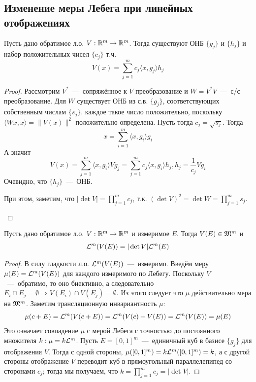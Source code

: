 \subsection{Изменение меры Лебега при линейных отображениях}
\begin{fact}[Из линала, б/д]
    Пусть дано обратимое л.о. $V: \mathbb{R}^m \rightarrow \mathbb{R}^m$. Тогда существуют ОНБ $\{g_j\}$ и $\{h_j\}$ и набор положительных чисел $\{c_j\}$ т.ч. \[V(x) = \sum\limits_{j = 1}^m c_j\langle x, g_j \rangle h_j\]
\end{fact}
\begin{proof}
    Рассмотрим $V^*$~---~сопряжённое к $V$ преобразование и $W = V^*V$~---~с/с преобразование. Для $W$  существует ОНБ из с.в. $\{g_j\}$, соответствующих собственным числам $\{s_j\}$. каждое такое число положительно, поскольку $\langle Wx, x \rangle = \|V(x)\|^2$ положительно определена. Пусть тогда $c_j = \sqrt{s_j}$. Тогда \[x = \sum\limits_{i = 1}^m \langle x, g_i \rangle g_i\]
    А значит \[V(x) = \sum\limits_{j = 1}^m \langle x, g_i \rangle Vg_j = \sum\limits_{j = 1}^m c_j \langle x, g_i \rangle h_j, h_j = \dfrac{1}{c_j}Vg_i\]
    Очевидно, что $\{h_j\}$~---~ОНБ.
\begin{note}
    При этом, заметим, что $|\det V| = \prod\limits_{j = 1}^m c_j$, т.к. $(\det V)^2 = \det W = \prod\limits_{j = 1}^m s_j$.
\end{note}
\end{proof}

\begin{theorem}
    Пусть дано обратимое л.о. $V: \mathbb{R}^m \rightarrow \mathbb{R}^m$ и измеримое $E$. Тогда $V(E) \in \mathfrak{M}^m$ и \[\mathcal{L}^m(V(E)) = |\det V| \mathcal{L}^m(E)\]
\end{theorem}
\begin{proof}
    В силу гладкости л.о. $\mathcal{L}^m(V(E))$~---~измеримо.
    Введём меру $\mu(E) = \mathcal{L}^m(V(E))$ для каждого измеримого по Лебегу. Поскольку $V$~---~обратимо, то оно биективно, а следовательно $E_i \cap E_j = \emptyset \Rightarrow V(E_i) \cap V(E_j) = \emptyset$. Из этого следует что $\mu$ действительно мера на $\mathfrak{M}^m$. Заметим трансляционную инвариантность $\mu$: \[\mu(c + E) = \mathcal{L}^m(V(c + E)) = \mathcal{L}^m(V(c) + V(E)) = \mathcal{L}^m(V(E)) = \mu(E)\]
    Это означает совпадение $\mu$ с мерой Лебега с точностью до постоянного множителя $k: \mu = k\mathcal{L}^m$. Пусть $E = [0, 1]^m$~---~единичный куб в базисе $\{g_j\}$ для отображения $V$. Тогда с одной стороны, $\mu([0, 1]^m) = k\mathcal{L}^m([0, 1]^m) = k$, а с другой стороны отображение $V$ переводит куб в прямоугольный параллелепипед со сторонами $c_j$; тогда мы получаем, что $k = \prod\limits_{j = 1}^m c_j = |\det V|$.
\end{proof}


